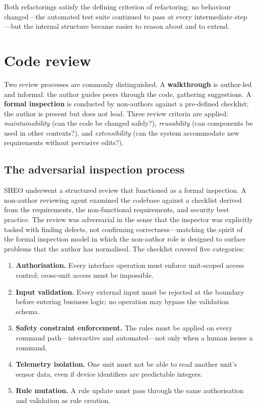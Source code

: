 Both refactorings satisfy the defining criterion of refactoring: no behaviour changed---the automated test
suite continued to pass at every intermediate step---but the internal structure became
easier to reason about and to extend.

\section{Code review}
\label{sec:code-review}

Two review processes are commonly distinguished. A \textbf{walkthrough} is author-led
and informal: the author guides peers through the code, gathering suggestions. A
\textbf{formal inspection} is conducted by non-authors against a pre-defined
checklist; the author is present but does not lead. Three review
criteria are applied: \emph{maintainability} (can the code be changed safely?),
\emph{reusability} (can components be used in other contexts?), and
\emph{extensibility} (can the system accommodate new requirements without pervasive
edits?).

\subsection{The adversarial inspection process}

SHEO underwent a structured review that functioned as a formal inspection. A
non-author reviewing agent examined the codebase against a checklist derived from the
requirements, the non-functional requirements, and security best practice. The review
was adversarial in the sense that the inspector was explicitly tasked with finding
defects, not confirming correctness---matching the spirit of the formal inspection
model in which the non-author role is designed to surface problems that the author has
normalised. The checklist covered five categories:

\begin{enumerate}
  \item \textbf{Authorisation.} Every interface operation must enforce unit-scoped
        access control; cross-unit access must be impossible.
  \item \textbf{Input validation.} Every external input must be rejected at the
        boundary before entering business logic; no operation may bypass the
        validation schema.
  \item \textbf{Safety constraint enforcement.} The  rules must be
        applied on every command path---interactive and automated---not only when a
        human issues a command.
  \item \textbf{Telemetry isolation.} One unit must not be able to read another
        unit's sensor data, even if device identifiers are predictable integers.
  \item \textbf{Rule mutation.} A rule update must pass through the same
        authorisation and validation as rule creation.
\end{enumerate}

